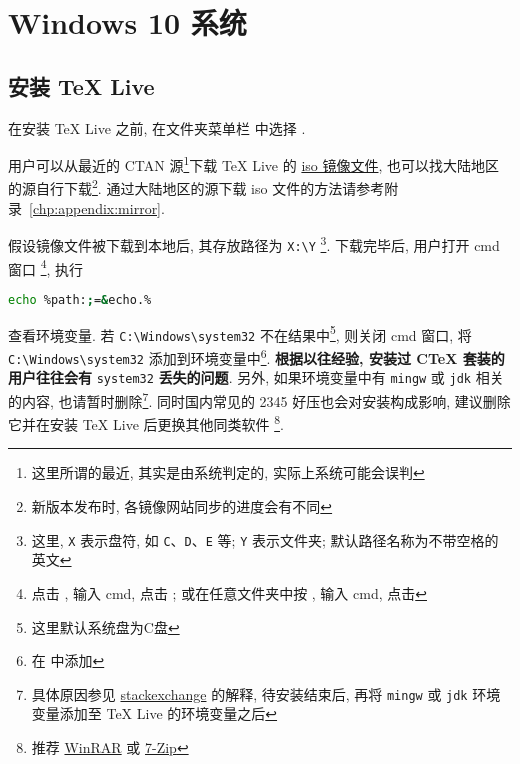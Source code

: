 
\chapter{Windows 10 系统}

\section{安装 \TeX{} Live}\label{sec:windows:install}

在安装 \TeX{} Live 之前,
在文件夹菜单栏  中选择 .

用户可以从最近的 CTAN 源\footnote{这里所谓的最近, 其实是由系统判定的, 实际上系统可能会误判}下载 \TeX{} Live 的
\href{https://mirrors.ctan.org/systems/texlive/Images/texlive2020.iso}{iso 镜像文件},
也可以找大陆地区的源自行下载\footnote{新版本发布时, 各镜像网站同步的进度会有不同}.
通过大陆地区的源下载 iso 文件的方法请参考附录~\ref{chp:appendix:mirror}.

假设镜像文件被下载到本地后,
其存放路径为 \texttt{X:\textbackslash Y}%
\footnote{这里, \texttt{X} 表示盘符,
如 \texttt{C}、\texttt{D}、\texttt{E} 等;
\texttt{Y} 表示文件夹;
默认路径名称为不带空格的英文}.
下载完毕后, 用户打开 \textsf{cmd} 窗口%
\footnote{点击 \keys{\faWindows},
输入 \textsf{cmd},
点击 \keys{\enter};
或在任意文件夹中按 ,
输入 \textsf{cmd},
点击 \keys{\enter}},
执行
\begin{lstlisting}[language = bash]
  echo %path:;=&echo.%
\end{lstlisting}
查看环境变量. 
若 \texttt{C:\textbackslash Windows\textbackslash system32}
不在结果中\footnote{这里默认系统盘为\textsf{C}盘},
则关闭 \textsf{cmd} 窗口,
将 \texttt{C:\textbackslash Windows\textbackslash system32}
添加到环境变量中\footnote{在  中添加}.
\textbf{根据以往经验, 安装过 C\TeX{} 套装的用户往往会有} \texttt{system32} \textbf{丢失的问题}. 
另外, 如果环境变量中有 \texttt{mingw} 或 \texttt{jdk} 相关的内容,
也请暂时删除\footnote{具体原因参见
\href{https://tex.stackexchange.com/questions/445086/error-installing-latest-version-of-tex-live-on-windows-10}{stackexchange} 
的解释, 待安装结束后, 再将 \texttt{mingw} 或 \texttt{jdk} 环境变量添加至 \TeX{} Live 的环境变量之后}.
同时国内常见的 2345 好压也会对安装构成影响,
建议删除它并在安装 \TeX{} Live 后更换其他同类软件%
\footnote{推荐 \href{http://www.winrar.com.cn/}{WinRAR}
或 \href{https://www.7-zip.org/}{7-Zip}}.

